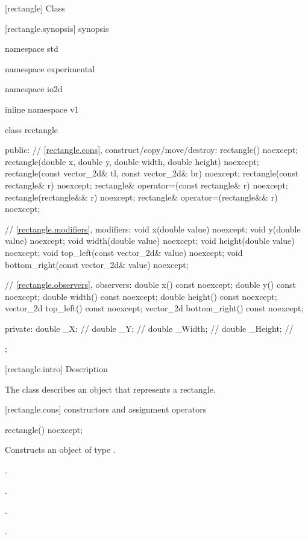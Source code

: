  [rectangle] {Class }

 [rectangle.synopsis] { synopsis}

\begin{codeblock}
namespace std { namespace experimental { namespace io2d { inline namespace v1 {
  class rectangle {
  public:
    // \ref{rectangle.cons}, construct/copy/move/destroy:
    rectangle() noexcept;
    rectangle(double x, double y, double width, double height) noexcept;
    rectangle(const vector_2d& tl, const vector_2d& br) noexcept;
    rectangle(const rectangle& r) noexcept;
    rectangle& operator=(const rectangle& r) noexcept;
    rectangle(rectangle&& r) noexcept;
    rectangle& operator=(rectangle&& r) noexcept;

    // \ref{rectangle.modifiers}, modifiers:
    void x(double value) noexcept;
    void y(double value) noexcept;
    void width(double value) noexcept;
    void height(double value) noexcept;
    void top_left(const vector_2d& value) noexcept;
    void bottom_right(const vector_2d& value) noexcept;
    
    // \ref{rectangle.observers}, observers:
    double x() const noexcept;
    double y() const noexcept;
    double width() const noexcept;
    double height() const noexcept;
    vector_2d top_left() const noexcept;
    vector_2d bottom_right() const noexcept;
    
  private:
    double _X;      // \expos
    double _Y;      // \expos
    double _Width;  // \expos
    double _Height; // \expos
  };
} } } }
\end{codeblock}

 [rectangle.intro] { Description}

\pnum
{}
The class  describes an object that represents a rectangle.

 [rectangle.cons] { constructors and assignment operators}

\begin{itemdecl}
rectangle() noexcept;
\end{itemdecl}
\begin{itemdescr}
	\pnum
	\effects
	Constructs an object of type .
	
	\pnum
	\postconditions
	.
	
	\pnum
	.
	
	\pnum
	.
	
	\pnum
	.

\end{itemdescr}

